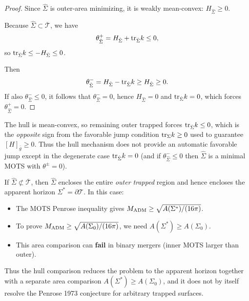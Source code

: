 \begin{proof}
Since $\hat{\Sigma}$ is outer-area minimizing, it is weakly mean-convex: $H_{\hat{\Sigma}} \ge 0$.

Because $\hat{\Sigma} \subset \overline{\mathcal{T}}$, we have
\[
    \theta^+_{\hat{\Sigma}} = H_{\hat{\Sigma}} + \mathrm{tr}_{\hat{\Sigma}} k \le 0,
\]
so $\mathrm{tr}_{\hat{\Sigma}} k \le -H_{\hat{\Sigma}} \le 0$.

Then
\[
    \theta^-_{\hat{\Sigma}} = H_{\hat{\Sigma}} - \mathrm{tr}_{\hat{\Sigma}} k \ge H_{\hat{\Sigma}} \ge 0.
\]
If also $\theta^-_{\hat{\Sigma}} \le 0$, it follows that $\theta^-_{\hat{\Sigma}} = 0$, hence $H_{\hat{\Sigma}} = 0$ and $\mathrm{tr}_{\hat{\Sigma}} k = 0$, which forces $\theta^+_{\hat{\Sigma}} = 0$.
\end{proof}

\begin{remark}[Interpretation]\label{rem:HullJangInterpretation}
The hull is mean-convex, so remaining outer trapped forces $\mathrm{tr}_{\hat{\Sigma}} k \le 0$, which is the \emph{opposite} sign from the favorable jump condition $\mathrm{tr}_{\Sigma} k \ge 0$ used to guarantee $[H]_{\bar{g}} \ge 0$. Thus the hull mechanism does not provide an automatic favorable jump except in the degenerate case $\mathrm{tr}_{\hat{\Sigma}} k = 0$ (and if $\theta^-_{\hat{\Sigma}} \le 0$ then $\hat{\Sigma}$ is a minimal MOTS with $\theta^\pm = 0$).
\end{remark}

\begin{remark}\label{rem:HullOutsideTrapped}
If $\hat{\Sigma} \not\subset \overline{\mathcal{T}}$, then $\hat{\Sigma}$ encloses the entire \emph{outer trapped} region and hence encloses the apparent horizon $\Sigma^* = \partial\mathcal{T}$. In this case:
\begin{itemize}
    \item The MOTS Penrose inequality gives $M_{\mathrm{ADM}} \ge \sqrt{A(\Sigma^*)/(16\pi)}$.
    \item To prove $M_{\mathrm{ADM}} \ge \sqrt{A(\Sigma_0)/(16\pi)}$, we need $A(\Sigma^*) \ge A(\Sigma_0)$.
    \item This area comparison can \textbf{fail} in binary mergers (inner MOTS larger than outer).
\end{itemize}
Thus the hull comparison reduces the problem to the apparent horizon together with a separate area comparison $A(\Sigma^*) \ge A(\Sigma_0)$, and it does not by itself resolve the Penrose 1973 conjecture for arbitrary trapped surfaces.
\end{remark}


